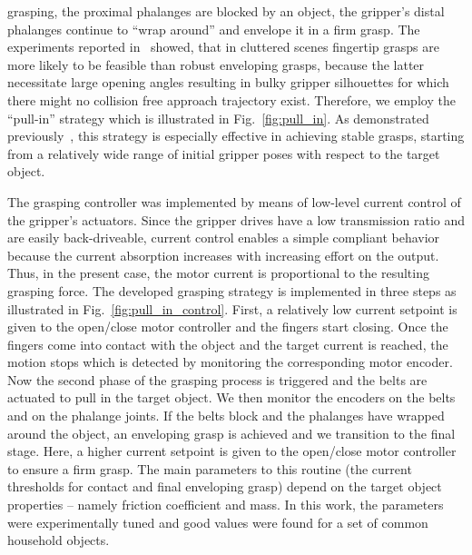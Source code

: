  grasping, the proximal phalanges are blocked by an object, the gripper’s distal phalanges continue
 to ``wrap around'' and envelope it in a firm grasp. The experiments reported in~\cite{Krug14a}
 showed, that in cluttered scenes fingertip grasps are more likely to be feasible than robust
 enveloping grasps, because the latter necessitate large opening angles resulting in bulky gripper
 silhouettes for which there might no collision free approach trajectory exist. Therefore, we employ
 the ``pull-in'' strategy which is illustrated in Fig.~\ref{fig:pull_in}. As demonstrated
 previously~\cite{Krug14c}, this strategy is especially effective in achieving stable grasps,
 starting from a relatively wide range of initial gripper poses with respect to the target object.
\par
The grasping controller was implemented by means of low-level current control of the gripper's
actuators. Since the gripper drives have a low transmission ratio and are easily back-driveable,
current control enables a simple compliant behavior because the current absorption increases with
increasing effort on the output. Thus, in the present case, the motor current is proportional to the
resulting grasping force. The developed grasping strategy is implemented in three steps as
illustrated in Fig.~\ref{fig:pull_in_control}. First, a relatively low current setpoint is given to
the open/close motor controller and the fingers start closing. Once the fingers come into contact
with the object and the target current is reached, the motion stops which is detected by monitoring
the corresponding motor encoder. Now the second phase of the grasping process is triggered and the
belts are actuated to pull in the target object.  We then monitor the encoders on the belts and on
the phalange joints. If the belts block and the phalanges have wrapped around the object, an
enveloping grasp is achieved and we transition to the final stage. Here, a higher current setpoint
is given to the open/close motor controller to ensure a firm grasp. The main parameters to this
routine (the current thresholds for contact and final enveloping grasp) depend on the target object
properties -- namely friction coefficient and mass. In this work, the parameters were
experimentally tuned and good values were found for a set of common household objects.
